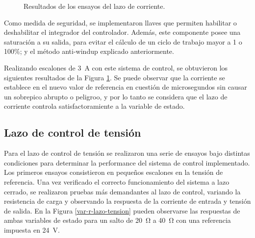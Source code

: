 \begin{figure}[hbt!]
  \centering
  \caption{Resultados de los ensayos del lazo de corriente.}
  \label{escalones-lazo-corriente}
\end{figure}

Como medida de seguridad, se implementaron llaves que permiten habilitar o deshabilitar el integrador del controlador. Además, este componente posee una saturación a su salida, para evitar el cálculo de un ciclo de trabajo mayor a 1 o 100\%; y el método anti-windup explicado anteriormente.

Realizando escalones de \SI{3}{\ampere} con este sistema de control, se obtuvieron los siguientes resultados de la Figura \ref{escalones-lazo-corriente}. Se puede observar que la corriente se establece en el nuevo valor de referencia en cuestión de microsegundos sin causar un sobrepico abrupto o peligroo, y por lo tanto se considera que el lazo de corriente controla satisfactoramiente a la variable de estado.

\subsection{Lazo de control de tensión}

Para el lazo de control de tensión se realizaron una serie de ensayos bajo distintas condiciones para determinar la performance del sistema de control implementado. Los primeros ensayos consistieron en pequeños escalones en la tensión de referencia. Una vez verificado el correcto funcionamiento del sistema a lazo cerrado, se realizaron pruebas más demandantes al lazo de control, variando la resistencia de carga y observando la respuesta de la corriente de entrada y tensión de salida. En la Figura \ref{var-r-lazo-tension} pueden observarse las respuestas de ambas variables de estado para un salto de \SI{20}{\ohm} a \SI{40}{\ohm} con una referencia impuesta en \SI{24}{\volt}.

